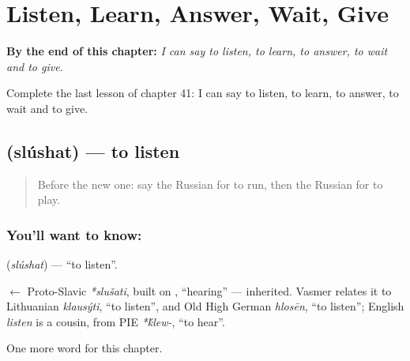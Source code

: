 
\chapter{Listen, Learn, Answer, Wait, Give}
\label{ch:ru-listen-learn-answer-wait-give}

\begin{chapteropening}
\textbf{By the end of this chapter:} \emph{I can say to listen, to learn, to answer, to wait and to give.}

Complete the last lesson of chapter 41: I can say to listen, to learn, to answer, to wait and to give.
\end{chapteropening}

\section[\texorpdfstring{\ru{слушать} (slúshat)}{слушать (slúshat)}]{ (slúshat) — to listen}

\label{lesson:RU-C41-slushat}



\begin{quote}
Before the new one: say the Russian for to run, then the Russian for to play.
\end{quote}

\subsection*{You'll want to know: }
\textbf{} (\emph{slúshat}) — \textquotedblleft{}to listen\textquotedblright{}.

\begin{cousinweb}
\textbf{} $\leftarrow$ Proto-Slavic \emph{*slušati}, built on \emph{}, \textquotedblleft{}hearing\textquotedblright{} — inherited. Vasmer relates it to Lithuanian \emph{klausýti}, \textquotedblleft{}to listen\textquotedblright{}, and Old High German \emph{hlosēn}, \textquotedblleft{}to listen\textquotedblright{}; English \emph{listen} is a cousin, from PIE \emph{*\'{k}lew-}, \textquotedblleft{}to hear\textquotedblright{}.
\end{cousinweb}

\begin{grammarlens}[title={What you've built}]
One more word for this chapter.
\end{grammarlens}


